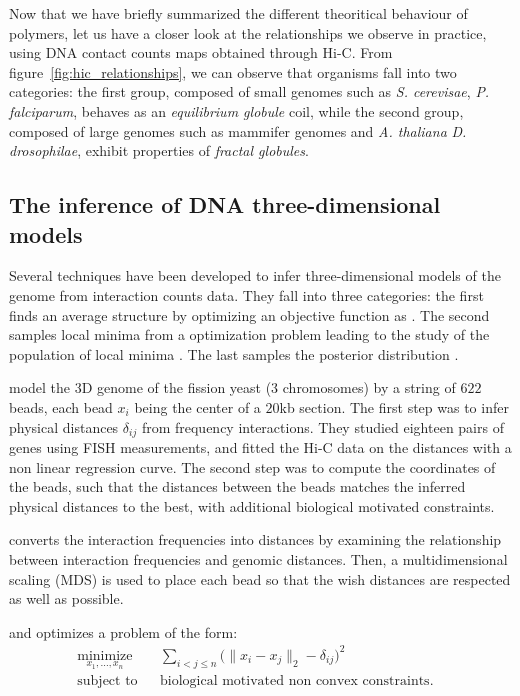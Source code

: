 Now that we have briefly summarized the different theoritical behaviour of
polymers, let us have a closer look at the relationships we
observe in practice, using DNA contact counts maps obtained through Hi-C.
From figure~\ref{fig:hic_relationships},
we can observe that organisms fall into two
categories: the first group, composed of small genomes such as \textit{S.
cerevisae}, \textit{P. falciparum}, behaves as an \textit{equilibrium globule}
coil, while the second group, composed of large genomes such as mammifer
genomes and \textit{A. thaliana} \textit{D. drosophilae}, exhibit properties
of \textit{fractal globules}.

\subsection{The inference of DNA three-dimensional models}


Several techniques have been developed to infer three-dimensional models of
the genome from interaction counts data. They fall into three categories: the
first finds an average structure by optimizing an objective function as
\citep{tanizawa:mapping, duan:three, ben-elazar:spatial}. The
second samples local minima from a optimization problem leading to the study
of the population of local minima \citep{bau:three-dimensional}. The last
samples the posterior distribution \citep{rousseau:three}.

\citet{tanizawa:mapping} model the 3D genome of the fission yeast (3
chromosomes) by a string of $622$ beads, each bead $x_i$ being the center of a
$20$kb section. The first step was to infer physical distances $\delta_{ij}$
from frequency interactions. They studied eighteen pairs of genes using FISH
measurements, and fitted the Hi-C data on the distances with a non linear
regression curve. The second step was to compute the coordinates of the beads,
such that the distances between the beads matches the inferred physical
distances to the best, with additional biological motivated constraints.

\citet{duan:three} converts the interaction frequencies into distances by
examining the relationship between interaction frequencies and genomic
distances. Then, a multidimensional scaling (MDS) is used to place each bead
so that the wish distances are respected as well as possible.

\citet{tanizawa:mapping} and \citet{duan:three} optimizes a problem of the
form:
\begin{equation*}
\renewcommand{\arraystretch}{2}
\begin{array}{ccll}
\underset{x_1,\ldots, x_n}{\text{minimize}} & &
\underset{i<j\leq n}{\sum} \big(\|x_i - x_j\|_2 - \delta_{ij}\big)^2 &\\
\text{subject to}
& & \text{biological motivated non convex constraints.}
\end{array}
\end{equation*}

